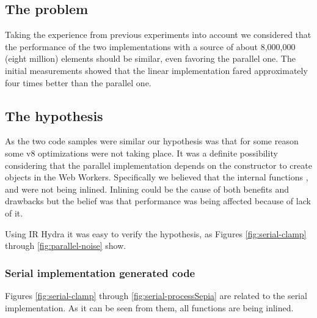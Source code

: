 \subsection{The problem}
Taking the experience from previous experiments into account we considered that the performance of the two implementations with a source  of about 8,000,000 (eight million) elements should be similar, even favoring the parallel one. The initial measurements showed that the linear implementation fared approximately four times better than the parallel one.

\subsection{The hypothesis}
As the two code samples were similar our hypothesis was that for some reason some v8 optimizations were not taking place. It was a definite possibility considering that the parallel implementation depends on the \tfunction{} constructor to create \tfunction{} objects in the Web Workers. Specifically we believed that the internal functions ,  and  were not being inlined. Inlining could be the cause of both benefits\cite{inline-pro} and drawbacks\cite{inline-cons} but the belief was that performance was being affected because of lack of it.

Using IR Hydra it was easy to verify the hypothesis, as Figures \ref{fig:serial-clamp} through \ref{fig:parallel-noise} show.


\subsubsection{Serial implementation generated code}
Figures \ref{fig:serial-clamp} through \ref{fig:serial-processSepia} are related to the serial implementation. As it can be seen from them, all functions are being inlined.

